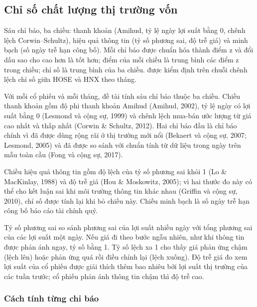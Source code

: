 \subsection{Chỉ số chất lượng thị trường vốn}\label{sec:mqi}

\begin{tomtat}
Sáu chỉ báo, ba chiều: thanh khoản (Amihud, tỷ lệ ngày lợi suất bằng 0, chênh lệch Corwin--Schultz), hiệu quả thông tin (tỷ số phương sai, độ trễ giá) và minh bạch (số ngày trễ hạn công bố). Mỗi chỉ báo được chuẩn hóa thành điểm z và đổi dấu sao cho cao hơn là tốt hơn; điểm của mỗi chiều là trung bình các điểm z trong chiều; chỉ số là trung bình của ba chiều.  được kiểm định trên chuỗi chênh lệch chỉ số giữa HOSE và HNX theo tháng.
\end{tomtat}

Với mỗi cổ phiếu và mỗi tháng, đề tài tính sáu chỉ báo thuộc ba chiều. Chiều thanh khoản gồm độ phi thanh khoản Amihud (Amihud, 2002), tỷ lệ ngày có lợi suất bằng 0 (Lesmond và cộng sự, 1999) và chênh lệch mua-bán ước lượng từ giá cao nhất và thấp nhất (Corwin \& Schultz, 2012). Hai chỉ báo đầu là chỉ báo chính vì đã được dùng rộng rãi ở thị trường mới nổi (Bekaert và cộng sự, 2007; Lesmond, 2005) và đã được so sánh với chuẩn tính từ dữ liệu trong ngày trên mẫu toàn cầu (Fong và cộng sự, 2017).

Chiều hiệu quả thông tin gồm độ lệch của tỷ số phương sai khỏi 1 (Lo \& MacKinlay, 1988) và độ trễ giá (Hou \& Moskowitz, 2005); vì hai thước đo này có thể cho kết luận sai khi môi trường thông tin khác nhau (Griffin và cộng sự, 2010), chỉ số được tính lại khi bỏ chiều này. Chiều minh bạch là số ngày trễ hạn công bố báo cáo tài chính quý.

Tỷ số phương sai so sánh phương sai của lợi suất nhiều ngày với tổng phương sai của các lợi suất một ngày. Nếu giá đi theo bước ngẫu nhiên, như khi thông tin được phản ánh ngay, tỷ số bằng 1. Tỷ số lệch xa 1 cho thấy giá phản ứng chậm (lệch lên) hoặc phản ứng quá rồi điều chỉnh lại (lệch xuống). Độ trễ giá đo xem lợi suất của cổ phiếu được giải thích thêm bao nhiêu bởi lợi suất thị trường của các tuần trước; cổ phiếu phản ánh thông tin chậm thì độ trễ cao.

\subsubsection*{Cách tính từng chỉ báo}

